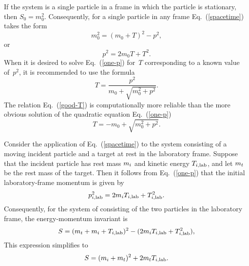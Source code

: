 {If the system is a single particle
in a frame in which the particle is stationary, then $S_0 = m_0^2$.
Consequently, for a single particle in
any frame Eq.~(\ref{spacetime}) takes the form
\begin{equation}
  m_0^2 = (m_0 + T)^2 - p^2,
 \label{spacetime-1}
\end{equation}
or
\begin{equation}
  p^2  = 2m_0 T + T^2.
  \label{one-p}
\end{equation}
When it is desired to solve Eq.~(\ref{one-p}) for~$T$ corresponding
to a known value of~$p^2$, it is recommended to use the formula
\begin{equation}
  T = \frac{p^2 }
          {m_0 + \sqrt{ m_0^2 + p^2 }}.
 \label{good-T}
\end{equation}
The relation Eq.~(\ref{good-T}) is computationally more reliable
than the more obvious solution of the quadratic equation Eq.~(\ref{one-p})
$$
  T = -m_0 + \sqrt{ m_0^2 + p^2 }.
$$

Consider the application of Eq.~(\ref{spacetime}) to the system
consisting of a moving incident particle and a target 
at rest in
the laboratory frame.  Suppose that the incident
particle has rest mass $m_i$ and kinetic
energy $T_{i,\textrm{lab}}$, and let $m_t$ be the rest mass of the
target.  Then it follows from Eq.~(\ref{one-p})
that the initial laboratory-frame momentum is given by
\begin{equation}
  p_{i,\textrm{lab}}^2  = 2m_i T_{i,\textrm{lab}} + T_{i,\textrm{lab}}^2.
 \label{p-lab-in}
\end{equation}
Consequently, for the system of consisting of the two particles
in the laboratory frame, the energy-momentum invariant is
$$
  S = (m_t + m_i + T_{i,\textrm{lab}})^2 -
      ( 2m_i T_{i,\textrm{lab}} + T_{i,\textrm{lab}}^2 ),
$$
This expression simplifies to
\begin{equation}
  S = (m_i + m_t )^2 + 2m_t T_{i,\textrm{lab}}.
  \label{S-lab}
\end{equation}

}

